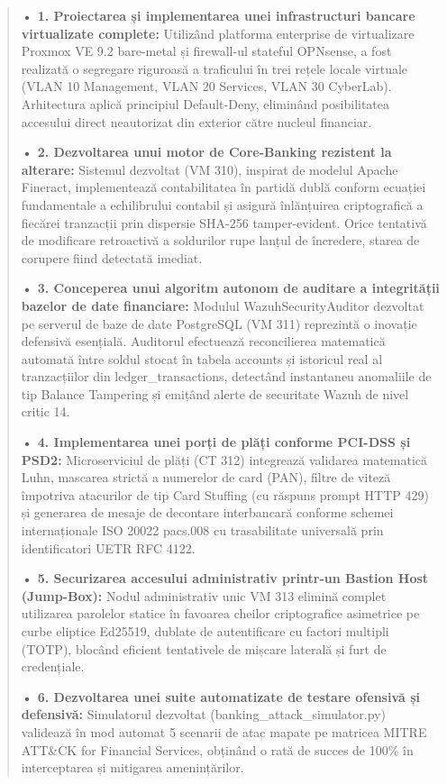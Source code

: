 \documentclass[
]{article}
\begin{document}
\begin{quote}
\textbf{• 1. Proiectarea și implementarea unei infrastructuri bancare
virtualizate complete:} Utilizând platforma enterprise de virtualizare
Proxmox VE 9.2 bare-metal și firewall-ul stateful OPNsense, a fost
realizată o segregare riguroasă a traficului în trei rețele locale
virtuale (VLAN 10 Management, VLAN 20 Services, VLAN 30 CyberLab).
Arhitectura aplică principiul Default-Deny, eliminând posibilitatea
accesului direct neautorizat din exterior către nucleul financiar.

\textbf{• 2. Dezvoltarea unui motor de Core-Banking rezistent la
alterare:} Sistemul dezvoltat (VM 310), inspirat de modelul Apache
Fineract, implementează contabilitatea în partidă dublă conform ecuației
fundamentale a echilibrului contabil și asigură înlănțuirea
criptografică a fiecărei tranzacții prin dispersie SHA-256
tamper-evident. Orice tentativă de modificare retroactivă a soldurilor
rupe lanțul de încredere, starea de corupere fiind detectată imediat.

\textbf{• 3. Conceperea unui algoritm autonom de auditare a integrității
bazelor de date financiare:} Modulul WazuhSecurityAuditor dezvoltat pe
serverul de baze de date PostgreSQL (VM 311) reprezintă o inovație
defensivă esențială. Auditorul efectuează reconcilierea matematică
automată între soldul stocat în tabela accounts și istoricul real al
tranzacțiilor din ledger\_transactions, detectând instantaneu anomaliile
de tip Balance Tampering și emițând alerte de securitate Wazuh de nivel
critic 14.

\textbf{• 4. Implementarea unei porți de plăți conforme PCI-DSS și
PSD2:} Microserviciul de plăți (CT 312) integrează validarea matematică
Luhn, mascarea strictă a numerelor de card (PAN), filtre de viteză
împotriva atacurilor de tip Card Stuffing (cu răspuns prompt HTTP 429)
și generarea de mesaje de decontare interbancară conforme schemei
internaționale ISO 20022 pacs.008 cu trasabilitate universală prin
identificatori UETR RFC 4122.

\textbf{• 5. Securizarea accesului administrativ printr-un Bastion Host
(Jump-Box):} Nodul administrativ unic VM 313 elimină complet utilizarea
parolelor statice în favoarea cheilor criptografice asimetrice pe curbe
eliptice Ed25519, dublate de autentificare cu factori multipli (TOTP),
blocând eficient tentativele de mișcare laterală și furt de credențiale.

\textbf{• 6. Dezvoltarea unei suite automatizate de testare ofensivă și
defensivă:} Simulatorul dezvoltat (banking\_attack\_simulator.py)
validează în mod automat 5 scenarii de atac mapate pe matricea MITRE
ATT\&CK for Financial Services, obținând o rată de succes de 100\% în
interceptarea și mitigarea amenințărilor.
\end{quote}
\end{document}
